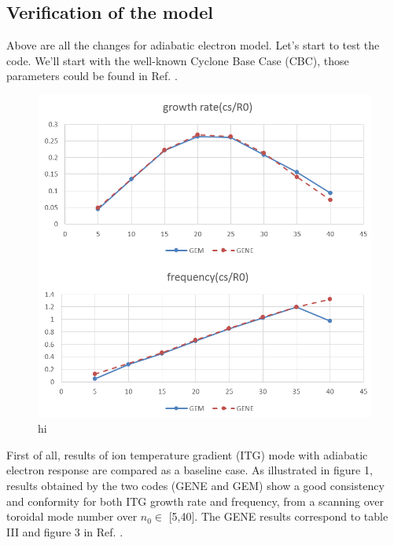 \documentclass[12pt]{article}
\begin{document}
\begin{CJK*}{UTF8}{gbsn}
\newpage
\section{Verification of the model}
Above are all the changes for adiabatic electron model. Let's start to test the code. We'll start with the well-known
Cyclone Base Case (CBC), those parameters could be found in Ref. \cite{gorler}. 

\begin{figure}[htb!]
\centering
\includegraphics[width=.9\textwidth]{fig1.png}
\caption{hi}
\label{fig1}
\end{figure}
First of all, results of ion temperature gradient (ITG) mode with adiabatic electron response are compared as a baseline
case. As illustrated in figure 1, results obtained by the two codes (GENE and GEM) show a good consistency and conformity 
for both ITG growth rate and frequency, from a scanning over toroidal mode number over $n_0\in$ [5,40]. The GENE results 
correspond to table III and figure 3 in Ref. \cite{gorler}. 



\newpage

\end{CJK*}
\end{document}
